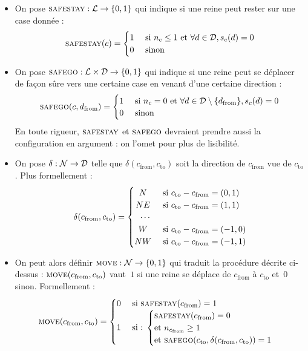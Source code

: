  \begin{itemize}
  \item On pose $\textsc{safestay} : {\mathcal{L}}\to\{0,1\}$ qui indique si une reine peut rester sur une case donnée : \[
 \Ss(c) =
  \begin{cases} 
      \hfill 1    \hfill & \text{ si $n_c\leq 1$ et $\forall d \in \D, s_c(d)=0$} \\
      \hfill 0 \hfill & \text{ sinon} \\
  \end{cases}
\]
 
  \item On pose $\textsc{safego} :  {\mathcal{L}\times\mathcal{D}}\to\{0,1\}$ qui indique si une reine peut se déplacer de façon sûre vers une certaine case en venant d'une certaine direction : \[
 \Sg(c, d_{\mathrm {from}}) =
  \begin{cases} 
      \hfill 1    \hfill & \text{ si $n_c=0$ et $\forall d \in \D\setminus\{d_{\mathrm{from}}\}, s_c(d)=0$} \\
      \hfill 0 \hfill & \text{ sinon} \\
  \end{cases}
\]
 En toute rigueur, $\textsc{safestay}$ et $\textsc{safego}$ devraient prendre aussi la configuration en argument : on l'omet pour plus de lisibilité.

  \item On pose $\delta :\mathcal{N}\to\mathcal{D}$ telle que $\delta(c_{\mathrm{from}}, c_{\mathrm{to}})$ soit la direction de $c_{\mathrm{from}}$ vue de $c_{\mathrm{to}}$. Plus formellement : \[
 \delta(c_{\mathrm{from}}, c_{\mathrm{to}}) =
  \begin{cases} 
    \hfill N    \hfill & \text{ si $c_{\mathrm{to}}-c_{\mathrm{from}}=(0,1)$} \\
    \hfill NE \hfill & \text{ si  $c_{\mathrm{to}}-c_{\mathrm{from}}=(1,1)$} \\
    \hfill \cdots & \\
    \hfill W \hfill & \text{ si  $c_{\mathrm{to}}-c_{\mathrm{from}}= (-1,0)$}\\
    \hfill NW \hfill & \text { si  $c_{\mathrm{to}}-c_{\mathrm{from}}=(-1,1)$}\\
  \end{cases}
\] 
  \item On peut alors définir $\textsc{move} :{\mathcal{N}}\to\{0,1\}$ qui traduit la procédure décrite ci-dessus : $\textsc{move}(c_{\mathrm{from}}, c_{\mathrm{to}})$ vaut~$1$ si une reine se déplace de $c_{\mathrm{from}}$ à $c_{\mathrm{to}}$ et~$0$ sinon. Formellement : \[
    \M(c_{\mathrm{from}}, c_{\mathrm{to}}) = 
    \begin{cases}
      \hfill 0 \hfill & \text{ si $\Ss(c_{\mathrm{from}})=1$} \\
      \hfill 1 \hfill & \text{ si : }{ \begin{cases} \Ss(c_{\mathrm{from}})=0 \\\text{et $n_{c_{\mathrm{from}}}\geq 1$} \\ \text{et } \Sg(c_{\mathrm{to}}, \delta(c_{\mathrm{from}}, c_{\mathrm{to}}))=1\\ \end{cases}}\\


\end{cases}\]
\end{itemize}
